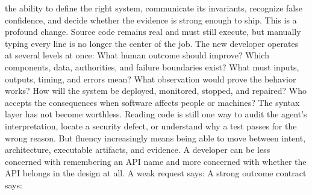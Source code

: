 {}the ability to define the right system, communicate its invariants, recognize\markdownRendererSoftLineBreak
{}false confidence, and decide whether the evidence is strong enough to ship.\markdownRendererParagraphSeparator
{}This is a profound change. Source code remains real and must still execute, but\markdownRendererSoftLineBreak
{}manually typing every line is no longer the center of the job. The new\markdownRendererSoftLineBreak
{}developer operates at several levels at once:\markdownRendererInterblockSeparator
{}\markdownRendererUlBegin
\markdownRendererUlItem {} What human outcome should improve?\markdownRendererUlItemEnd 
\markdownRendererUlItem {} Which components, data, authorities, and failure boundaries exist?\markdownRendererUlItemEnd 
\markdownRendererUlItem {} What must inputs, outputs, timing, and errors mean?\markdownRendererUlItemEnd 
\markdownRendererUlItem {} What observation would prove the behavior works?\markdownRendererUlItemEnd 
\markdownRendererUlItem {} How will the system be deployed, monitored, stopped, and repaired?\markdownRendererUlItemEnd 
\markdownRendererUlItem {} Who accepts the consequences when software affects people or machines?\markdownRendererUlItemEnd 
\markdownRendererUlEnd \markdownRendererInterblockSeparator
{}The syntax layer has not become worthless. Reading code is still one way to\markdownRendererSoftLineBreak
{}audit the agent's interpretation, locate a security defect, or understand why\markdownRendererSoftLineBreak
{}a test passes for the wrong reason. But fluency increasingly means being able\markdownRendererSoftLineBreak
{}to move between intent, architecture, executable artifacts, and evidence. A\markdownRendererSoftLineBreak
{}developer can be less concerned with remembering an API name and more\markdownRendererSoftLineBreak
{}concerned with whether the API belongs in the design at all.\markdownRendererInterblockSeparator
{}\markdownRendererSectionBegin
{}\markdownRendererInterblockSeparator
{}A weak request says:\markdownRendererInterblockSeparator
{}\markdownRendererInterblockSeparator
{}A strong outcome contract says:\markdownRendererInterblockSeparator
